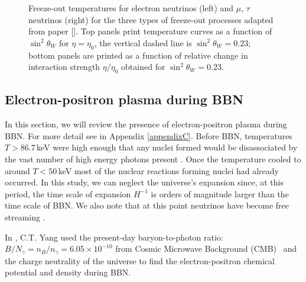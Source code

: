 \begin{figure}[ht]
\caption{Freeze-out temperatures for electron neutrinos (left) and $\mu$, $\tau$ neutrinos (right) for the three types of freeze-out processes adapted from paper [\cite{Birrell:2014uka}]. Top panels print temperature curves as a function of $\sin^2\theta_W$ for $\eta=\eta_0$, the vertical dashed line is $\sin^2\theta_W=0.23$; bottom panels are printed as a function of relative change in interaction strength $\eta/\eta_0$ obtained for $\sin^2\theta_W=0.23$.}
\label{fig:freezeoutT}
 \end{figure}

\subsection{Electron-positron plasma during BBN}\label{sec:density}
In this section, we will review the presence of electron-positron plasma during BBN. For more detail see \cite{Grayson:2023flr} in Appendix \ref{appendixC}. Before BBN, temperatures $T>86.7\,$keV were high enough that any nuclei formed would be disassociated by the vast number of high energy photons present \cite{Pitrou:2018cgg}. Once the temperature cooled to around $T<50\,$keV most of the nuclear reactions forming nuclei had already occurred. In this study, we can neglect the universe's expansion since, at this period, the time scale of expansion $H^{-1}$ is orders of magnitude larger than the time scale of BBN. We also note that at this point neutrinos have become free streaming \cite{Birrell:2012gg}.

In \cite{Grayson:2022asf}, C.T. Yang used the present-day baryon-to-photon ratio: $B/N_\gamma =n_B/n_\gamma= 6.05\times10^{-10}$ from Cosmic Microwave Background (CMB)~\cite{ParticleDataGroup:2022pth} and the charge neutrality of the universe to find the electron-positron chemical potential and density during BBN.


